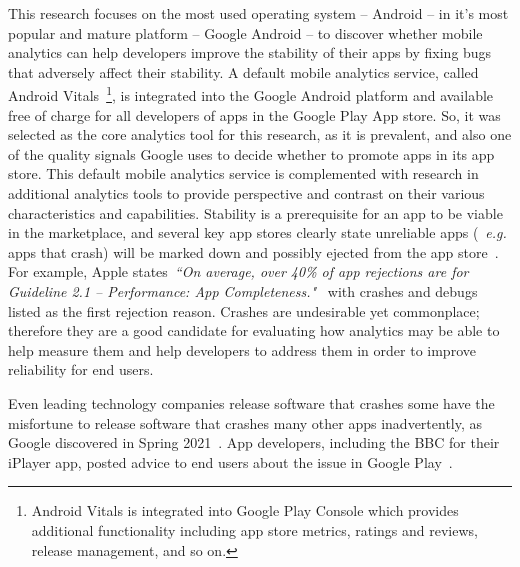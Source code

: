 This research focuses on the most used operating system -- Android -- in it's most popular and mature platform -- Google Android -- to discover whether mobile analytics can help developers improve the stability of their apps by fixing bugs that adversely affect their stability. A default mobile analytics service, called Android Vitals~\footnote{Android Vitals is integrated into Google Play Console which provides additional functionality including app store metrics, ratings and reviews, release management, and so on.}, is integrated into the Google Android platform and available free of charge for all developers of apps in the Google Play App store. So, it was selected as the core analytics tool for this research, as it is prevalent, and also one of the quality signals Google uses to decide whether to promote apps in its app store. This default mobile analytics service is complemented with research in additional analytics tools to provide perspective and contrast on their various characteristics and capabilities.
%
Stability is a prerequisite for an app to be viable in the marketplace, and several key app stores clearly state unreliable apps (~\emph{e.g.} apps that crash) will be marked down and possibly ejected from the app store~\citep{appleappstore2021_app_completeness, google_play_policy_center_broken_functionality, huaweidevelopers_appgallery_review_guidelines}. For example, Apple states~\emph{``On average, over 40\% of app rejections are for Guideline 2.1 – Performance: App Completeness."}~\citep{appleappstore2021_review_avoiding_common_app_rejections} with crashes and debugs listed as the first rejection reason. %
Crashes are undesirable yet commonplace; therefore they are a good candidate for evaluating how analytics may be able to help measure them and help developers to address them in order to improve reliability for end users.


Even leading technology companies release software that crashes some have the misfortune to release software that crashes many other apps inadvertently, as Google discovered in Spring 2021~\citep{bbcnews2021_google_fixes_crashing_android_app_issues}. App developers, including the BBC for their iPlayer app, posted advice to end users about the issue in Google Play~\citep{bbc_iplayer_app_april_2021_webview_information}.

